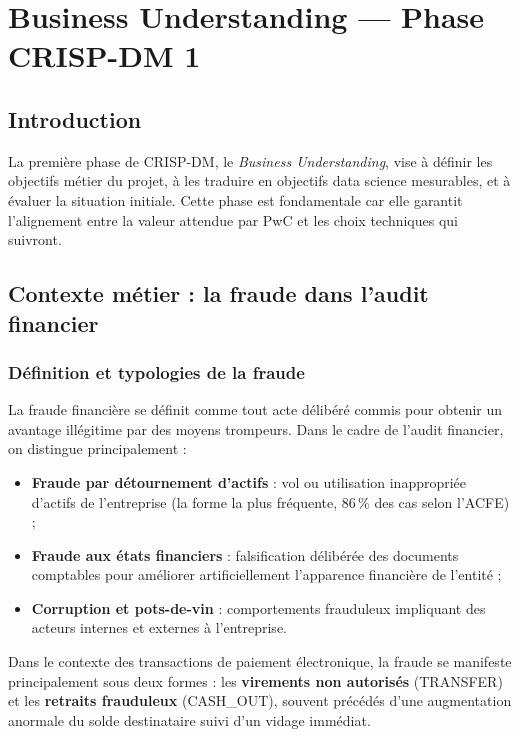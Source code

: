\documentclass[12pt,a4paper,twoside]{report}
\theoremstyle{definition}
\begin{document}
\chapter{Business Understanding — Phase CRISP-DM 1}
\label{chap:business}

\section{Introduction}

La première phase de CRISP-DM, le \textit{Business Understanding}, vise à définir
les objectifs métier du projet, à les traduire en objectifs data science mesurables,
et à évaluer la situation initiale. Cette phase est fondamentale car elle garantit
l'alignement entre la valeur attendue par PwC et les choix techniques qui suivront.

\section{Contexte métier : la fraude dans l'audit financier}

\subsection{Définition et typologies de la fraude}

La fraude financière se définit comme tout acte délibéré commis pour obtenir un
avantage illégitime par des moyens trompeurs. Dans le cadre de l'audit financier,
on distingue principalement :

\begin{itemize}
  \item \textbf{Fraude par détournement d'actifs} : vol ou utilisation inappropriée
    d'actifs de l'entreprise (la forme la plus fréquente, 86\,\% des cas selon l'ACFE) ;
  \item \textbf{Fraude aux états financiers} : falsification délibérée des documents
    comptables pour améliorer artificiellement l'apparence financière de l'entité ;
  \item \textbf{Corruption et pots-de-vin} : comportements frauduleux impliquant
    des acteurs internes et externes à l'entreprise.
\end{itemize}

Dans le contexte des transactions de paiement électronique, la fraude se manifeste
principalement sous deux formes : les \textbf{virements non autorisés} (TRANSFER) et
les \textbf{retraits frauduleux} (CASH\_OUT), souvent précédés d'une augmentation
anormale du solde destinataire suivi d'un vidage immédiat.
\end{document}
